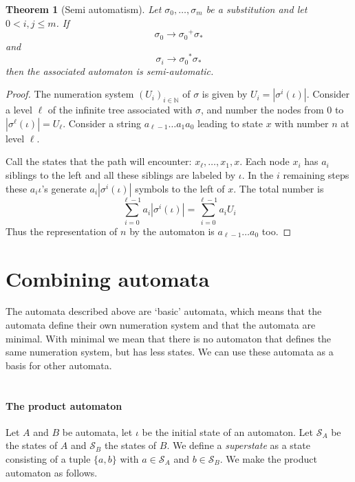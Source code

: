 \documentclass{article}
\newtheorem{theorem}{Theorem}[subsection]
\theoremstyle{definition}
\begin{document}
\begin{theorem}[Semi automatism] \label{thm:semiaut}
Let $\sigma_0, \ldots, \sigma_m$ be a substitution and let $0 < i, j \le m$. If
\begin{displaymath}
\sigma_0 \rightarrow {\sigma_0}^+ \sigma_*
\end{displaymath}
and
\begin{displaymath}
\sigma_i \rightarrow {\sigma_0}^* \sigma_*
\end{displaymath}
then the associated automaton is semi-automatic.
\end{theorem}
\begin{proof}
The numeration system $(U_i)_{i \in \mathbb{N}}$ of $\sigma$ is given by
$U_i = |\sigma^i(\iota)|$. 
Consider a level $\ell$ of the infinite tree associated with $\sigma$, and 
number the nodes from 0 to $|\sigma^\ell(\iota)| = U_\ell$.
Consider a string $a_{\ell - 1} \ldots a_1 a_0$ leading to state $x$ with 
number $n$ at level $\ell$.

Call the states that the path will encounter: $x_\ell, \ldots, x_1, x$. 
Each node $x_i$ has $a_i$ siblings to the left and all these siblings are
labeled by $\iota$. In the $i$ remaining steps these $a_i \iota$'s generate
$a_i |\sigma^i(\iota)|$ symbols to the left of $x$. The total number is 
\begin{displaymath}
\sum_{i = 0}^{\ell - 1} a_i |\sigma^i(\iota)| = \sum_{i = 0}^{\ell - 1} a_i U_i
\end{displaymath}
Thus the representation of $n$ by the automaton is $a_{\ell - 1} \ldots a_0$
too.
\end{proof}

\section{Combining automata}
The automata described above are `basic' automata, which means that the 
automata define their own numeration system and that the automata are minimal.
With minimal we mean that there is no automaton that defines the same 
numeration system, but has less states.
We can use these automata as a basis for other automata.\\
\\
\paragraph{The product automaton}
Let $A$ and $B$ be automata, let $\iota$ be the initial state of an automaton.
Let $\mathcal{S}_A$ be the states of $A$ and $\mathcal{S}_B$ the states of $B$.
We define a \emph{superstate} as a state consisting of a tuple $\{a, b\}$ with
$a \in \mathcal{S}_A$ and $b \in \mathcal{S}_B$. We make the product automaton
as follows.
\end{document}
